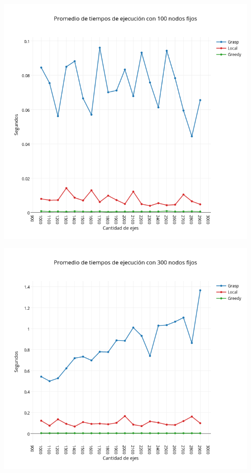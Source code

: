 \begin{center}
 	\includegraphics[width=13cm, keepaspectratio=yes]{imagenes/coliseo/Fixnode/100.png}

 	\includegraphics[width=13cm, keepaspectratio=yes]{imagenes/coliseo/Fixnode/300.png}


\end{center}
